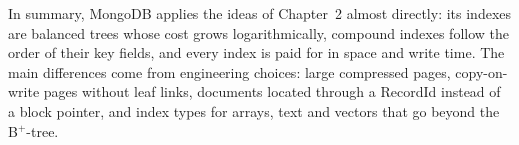 In summary, MongoDB applies the ideas of Chapter~2 almost directly: its indexes are balanced trees
whose cost grows logarithmically, compound indexes follow the order of their key fields, and every
index is paid for in space and write time. The main differences come from engineering choices:
large compressed pages, copy-on-write pages without leaf links, documents located through a
RecordId instead of a block pointer, and index types for arrays, text and vectors that go beyond
the B$^+$-tree.
